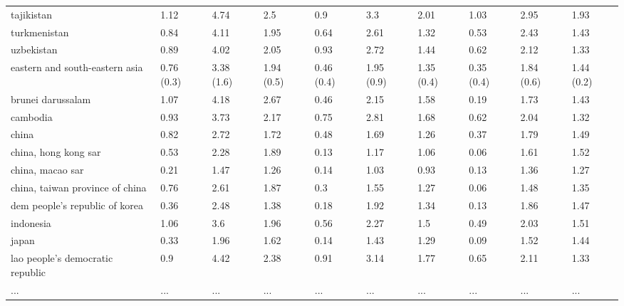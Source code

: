 \begin{table}[!h]
\begin{tabular}[t]{llllllllll}
\addlinespace
tajikistan & 1.12 & 4.74 & 2.5 & 0.9 & 3.3 & 2.01 & 1.03 & 2.95 & 1.93\\
turkmenistan & 0.84 & 4.11 & 1.95 & 0.64 & 2.61 & 1.32 & 0.53 & 2.43 & 1.43\\
uzbekistan & 0.89 & 4.02 & 2.05 & 0.93 & 2.72 & 1.44 & 0.62 & 2.12 & 1.33\\
eastern and south-eastern asia & 0.76 (0.3) & 3.38 (1.6) & 1.94 (0.5) & 0.46 (0.4) & 1.95 (0.9) & 1.35 (0.4) & 0.35 (0.4) & 1.84 (0.6) & 1.44 (0.2)\\
brunei darussalam & 1.07 & 4.18 & 2.67 & 0.46 & 2.15 & 1.58 & 0.19 & 1.73 & 1.43\\
\addlinespace
cambodia & 0.93 & 3.73 & 2.17 & 0.75 & 2.81 & 1.68 & 0.62 & 2.04 & 1.32\\
china & 0.82 & 2.72 & 1.72 & 0.48 & 1.69 & 1.26 & 0.37 & 1.79 & 1.49\\
china, hong kong sar & 0.53 & 2.28 & 1.89 & 0.13 & 1.17 & 1.06 & 0.06 & 1.61 & 1.52\\
china, macao sar & 0.21 & 1.47 & 1.26 & 0.14 & 1.03 & 0.93 & 0.13 & 1.36 & 1.27\\
china, taiwan province of china & 0.76 & 2.61 & 1.87 & 0.3 & 1.55 & 1.27 & 0.06 & 1.48 & 1.35\\
\addlinespace
dem people's republic of korea & 0.36 & 2.48 & 1.38 & 0.18 & 1.92 & 1.34 & 0.13 & 1.86 & 1.47\\
indonesia & 1.06 & 3.6 & 1.96 & 0.56 & 2.27 & 1.5 & 0.49 & 2.03 & 1.51\\
japan & 0.33 & 1.96 & 1.62 & 0.14 & 1.43 & 1.29 & 0.09 & 1.52 & 1.44\\
lao people's democratic republic & 0.9 & 4.42 & 2.38 & 0.91 & 3.14 & 1.77 & 0.65 & 2.11 & 1.33\\
... & ... & ... & ... & ... & ... & ... & ... & ... & ...\\
\bottomrule
\end{tabular}
\end{table}
